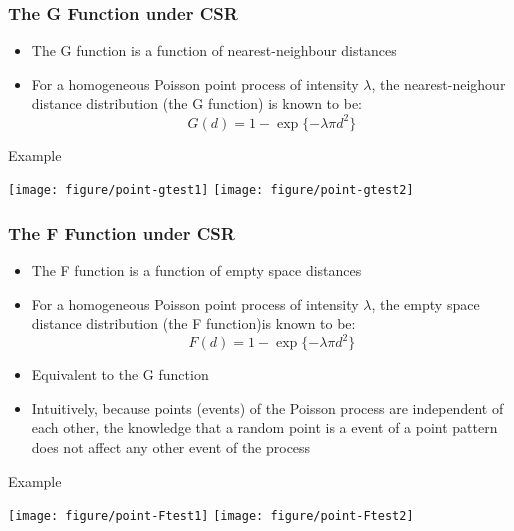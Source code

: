\documentclass[10pt]{beamer}\usepackage[]{graphicx}\usepackage[]{color}
\newenvironment{knitrout}{}{} %
\newcommand{\bitemize}{\begin{itemize}}
\newcommand{\eitemize}{\end{itemize}}
\newcommand{\bblock}{\begin{block}}
\newcommand{\eblock}{\end{block}}
\begin{document}
\begin{frame}
\frametitle{The G Function under CSR}

\bitemize
\item The G function is a function of nearest-neighbour distances
\item For a homogeneous Poisson point process of intensity $\lambda$, the nearest-neighour distance distribution (the G function) is known to be:
\[
G(d) = 1-\exp\{-\lambda\pi d^2\}
\]
\eitemize

\bblock{Example}
\begin{knitrout}
\color{fgcolor}

{\centering \texttt{[image: figure/point-gtest1]} 
\texttt{[image: figure/point-gtest2]} 

}



\end{knitrout}

\eblock

\end{frame}

\begin{frame}
\frametitle{The F Function under CSR}

\bitemize
\item The F function is a function of empty space distances
\item For a homogeneous Poisson point process of intensity $\lambda$, the empty space distance distribution (the F function)is known to be:
\[
F(d) = 1-\exp\{-\lambda\pi d^2\}
\]
\item Equivalent to the G function 
\item Intuitively, because points (events) of the Poisson process are independent of each other, the knowledge that a random point is a 
event of a point pattern does not affect any other event of the process
\eitemize

\bblock{Example}
\begin{knitrout}
\color{fgcolor}

{\centering \texttt{[image: figure/point-Ftest1]} 
\texttt{[image: figure/point-Ftest2]} 

}



\end{knitrout}

\eblock

\end{frame}
\end{document}
